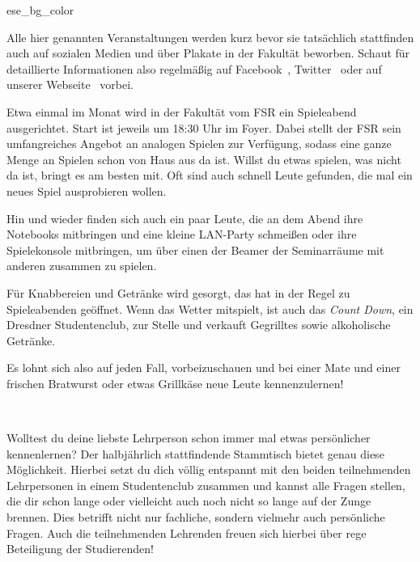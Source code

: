 
\begin{awesomeblock}{2pt}{\faInfoCircle}{ese_bg_color}
    \begin{minipage}[t]{.82\textwidth}
        Alle hier genannten Veranstaltungen werden kurz bevor sie tatsächlich stattfinden auch auf sozialen Medien und über Plakate in der Fakultät beworben. Schaut für detaillierte Informationen also regelmäßig auf Facebook~, Twitter~ oder auf unserer Webseite~ vorbei.
    \end{minipage}
\end{awesomeblock}


Etwa einmal im Monat wird in der Fakultät vom FSR ein Spieleabend ausgerichtet. Start ist jeweils um 18:30 Uhr im Foyer. Dabei stellt der FSR sein umfangreiches Angebot an analogen Spielen zur Verfügung, sodass eine ganze Menge an Spielen schon von Haus aus da ist. Willst du etwas spielen, was nicht da ist, bringt es am besten mit. Oft sind auch schnell Leute gefunden, die mal ein neues Spiel ausprobieren wollen.

Hin und wieder finden sich auch ein paar Leute, die an dem Abend ihre Notebooks mitbringen und eine kleine LAN-Party schmeißen oder ihre Spielekonsole mitbringen, um über einen der Beamer der Seminarräume mit anderen zusammen zu spielen.

Für Knabbereien und Getränke wird gesorgt, das \ascii{} hat in der Regel zu Spieleabenden geöffnet. Wenn das Wetter mitspielt, ist auch das \emph{Count Down}, ein Dresdner Studentenclub, zur Stelle und verkauft Gegrilltes sowie alkoholische Getränke.

Es lohnt sich also auf jeden Fall, vorbeizuschauen und bei einer Mate und einer frischen Bratwurst oder etwas Grillkäse neue Leute kennenzulernen!

\pagebreak
 
\
\thispagestyle{empty}

\pagebreak


Wolltest du deine liebste Lehrperson schon immer mal etwas persönlicher kennenlernen? Der halbjährlich stattfindende Stammtisch bietet genau diese Möglichkeit. Hierbei setzt du dich völlig entspannt mit den beiden teilnehmenden Lehrpersonen in einem Studentenclub zusammen und kannst alle Fragen stellen, die dir schon lange oder vielleicht auch noch nicht so lange auf der Zunge brennen. Dies betrifft nicht nur fachliche, sondern vielmehr auch persönliche Fragen. Auch die teilnehmenden Lehrenden freuen sich hierbei über rege Beteiligung der Studierenden!

